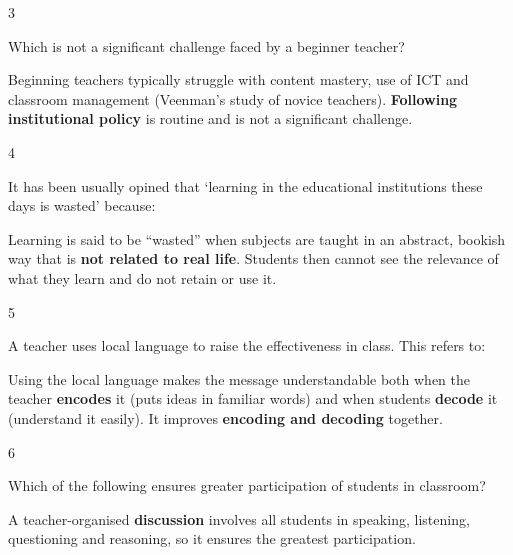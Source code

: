 \begin{question}{3}
{Which is not a significant challenge faced by a beginner teacher?\par}
\begin{explain}
Beginning teachers typically struggle with content mastery, use of ICT and classroom management (Veenman's study of novice teachers). \textbf{Following institutional policy} is routine and is not a significant challenge.
\end{explain}
\end{question}

\begin{question}{4}
{It has been usually opined that `learning in the educational institutions these days is wasted' because:\par}
\begin{explain}
Learning is said to be ``wasted'' when subjects are taught in an abstract, bookish way that is \textbf{not related to real life}. Students then cannot see the relevance of what they learn and do not retain or use it.
\end{explain}
\end{question}

\begin{question}{5}
{A teacher uses local language to raise the effectiveness in class. This refers to:\par}
\begin{explain}
Using the local language makes the message understandable both when the teacher \textbf{encodes} it (puts ideas in familiar words) and when students \textbf{decode} it (understand it easily). It improves \textbf{encoding and decoding} together.
\end{explain}
\end{question}

\begin{question}{6}
{Which of the following ensures greater participation of students in classroom?\par}
\begin{explain}
A teacher-organised \textbf{discussion} involves all students in speaking, listening, questioning and reasoning, so it ensures the greatest participation.
\end{explain}
\end{question}

